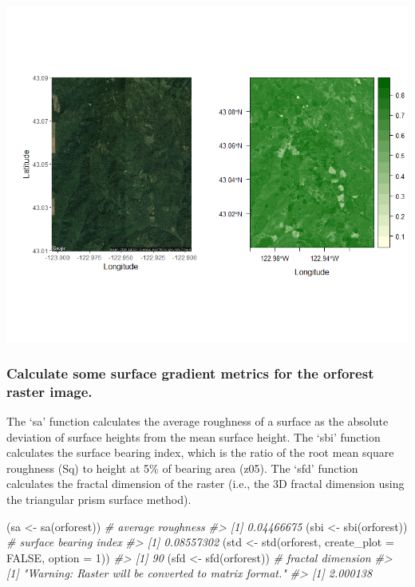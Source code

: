 \documentclass[
]{article}
\newenvironment{Shaded}{\begin{snugshade}}{\end{snugshade}}
\newcommand{\AttributeTok}[1]{\textcolor[rgb]{0.77,0.63,0.00}{#1}}
\newcommand{\CommentTok}[1]{\textcolor[rgb]{0.56,0.35,0.01}{\textit{#1}}}
\newcommand{\ConstantTok}[1]{\textcolor[rgb]{0.00,0.00,0.00}{#1}}
\newcommand{\DecValTok}[1]{\textcolor[rgb]{0.00,0.00,0.81}{#1}}
\newcommand{\FunctionTok}[1]{\textcolor[rgb]{0.00,0.00,0.00}{#1}}
\newcommand{\NormalTok}[1]{#1}
\newcommand{\OtherTok}[1]{\textcolor[rgb]{0.56,0.35,0.01}{#1}}
\begin{document}
\includegraphics[width=0.9\linewidth]{orig_ndvi_figure}

\hypertarget{calculate-some-surface-gradient-metrics-for-the-orforest-raster-image.}{%
\subsubsection{Calculate some surface gradient metrics for the orforest
raster
image.}\label{calculate-some-surface-gradient-metrics-for-the-orforest-raster-image.}}

The `sa' function calculates the average roughness of a surface as the
absolute deviation of surface heights from the mean surface height. The
`sbi' function calculates the surface bearing index, which is the ratio
of the root mean square roughness (Sq) to height at 5\% of bearing area
(z05). The `sfd' function calculates the fractal dimension of the raster
(i.e., the 3D fractal dimension using the triangular prism surface
method).

\begin{Shaded}
\begin{Highlighting}[]
\NormalTok{(sa }\OtherTok{\textless{}{-}} \FunctionTok{sa}\NormalTok{(orforest)) }\CommentTok{\# average roughness}
\CommentTok{\#\textgreater{} [1] 0.04466675}
\NormalTok{(sbi }\OtherTok{\textless{}{-}} \FunctionTok{sbi}\NormalTok{(orforest)) }\CommentTok{\# surface bearing index}
\CommentTok{\#\textgreater{} [1] 0.08557302}
\NormalTok{(std }\OtherTok{\textless{}{-}} \FunctionTok{std}\NormalTok{(orforest, }\AttributeTok{create\_plot =} \ConstantTok{FALSE}\NormalTok{, }\AttributeTok{option =} \DecValTok{1}\NormalTok{))}
\CommentTok{\#\textgreater{} [1] 90}
\NormalTok{(sfd }\OtherTok{\textless{}{-}} \FunctionTok{sfd}\NormalTok{(orforest)) }\CommentTok{\# fractal dimension}
\CommentTok{\#\textgreater{} [1] "Warning: Raster will be converted to matrix format."}
\CommentTok{\#\textgreater{} [1] 2.000138}
\end{Highlighting}
\end{Shaded}
\end{document}

